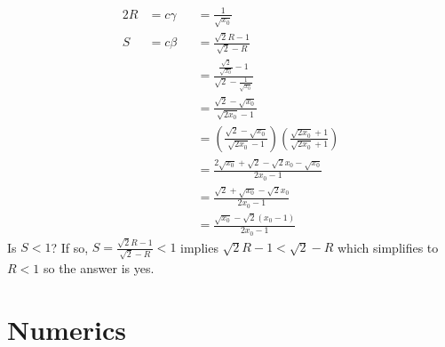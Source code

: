 \begin{alignat*}{2}
R &= c\gamma &&= \frac{1}{\sqrt{x_0}} \\
S &= c\beta  &&= \frac{\sqrt{2}R-1}{\sqrt{2}-R} \\
  &          &&= \frac{\frac{\sqrt{2}}{\sqrt{x_0}}-1}{\sqrt{2}-\frac{1}{\sqrt{x_0}}} \\
  &          &&= \frac{\sqrt{2}-\sqrt{x_0}}{\sqrt{2x_0}-1} \\
  &          &&= \left(\frac{\sqrt{2}-\sqrt{x_0}}{\sqrt{2x_0}-1}\right)
                 \left(\frac{\sqrt{2x_0}+1}{\sqrt{2x_0}+1}\right) \\
  &          &&= \frac{2\sqrt{x_0}+\sqrt{2}-\sqrt{2}x_0-\sqrt{x_0}}{2x_0-1} \\
  &          &&= \frac{\sqrt{2}+\sqrt{x_0}-\sqrt{2}x_0}{2x_0-1} \\
  &          &&= \frac{\sqrt{x_0} - \sqrt{2}(x_0-1)}{2x_0-1}
\end{alignat*}
Is $S < 1$?  If so, $S = \frac{\sqrt{2}R-1}{\sqrt{2}-R} < 1$ implies
$\sqrt{2}R-1 < \sqrt{2}-R$ which simplifies to $R < 1$ so the answer is yes.

\section*{Numerics}

